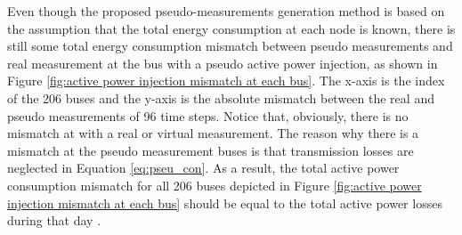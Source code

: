 Even though the proposed pseudo-measurements generation method is based on the assumption that the total energy consumption at each node is known, there is still some total energy consumption mismatch between pseudo measurements and real measurement at the bus with a pseudo active power injection, as shown in Figure \ref{fig:active power injection mismatch at each bus}. The x-axis is the index of the 206 buses and the y-axis is the absolute mismatch between the real and pseudo measurements of 96 time steps. Notice that, obviously, there is no mismatch at with a real or virtual measurement. The reason why there is a mismatch at the pseudo measurement buses is that transmission losses are neglected in Equation \ref{eq:pseu_con}. As a result, the total active power consumption mismatch for all 206 buses depicted in Figure \ref{fig:active power injection mismatch at each bus} should be equal to the total active power losses during that day \cite{ghosh1997load}.